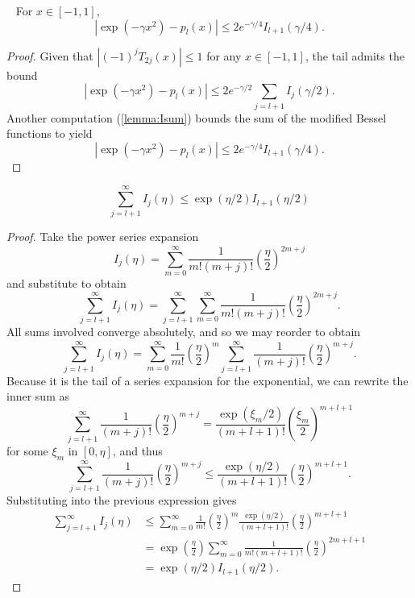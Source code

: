 \begin{lemma}~\label{lemma:errbnd}
  For $x \in [-1,1]$,
  \[
    |\exp(-\gamma x^2)-p_l(x)| \leq 2 e^{-\gamma/4} I_{l+1}(\gamma/4).
  \]
\end{lemma}
\begin{proof}
Given that
$|(-1)^j T_{2j}(x)| \leq 1$ for any $x \in [-1,1]$, the tail
admits the bound
\[
  |\exp(-\gamma x^2)-p_l(x)| \leq
  2 e^{-\gamma/2} \sum_{j=l+1} I_j(\gamma/2).
\]
Another computation (\autoref{lemma:Isum}) bounds the sum of the
modified Bessel functions to yield
\[
  |\exp(-\gamma x^2)-p_l(x)| \leq
  2 e^{-\gamma/4} I_{l+1}(\gamma/4).
\]
\end{proof}


\begin{lemma}\label{lemma:Isum}
  \[
    \sum_{j=l+1}^\infty I_j(\eta) \leq \exp(\eta/2) I_{l+1}(\eta/2)
  \]
\end{lemma}
\begin{proof}
Take the power series expansion
\[
  I_j(\eta) =
    \sum_{m=0}^\infty \frac{1}{m! (m+j)!} \left(\frac{\eta}{2}\right)^{2m+j}
\]
and substitute to obtain
\[
  \sum_{j=l+1}^\infty I_j(\eta) =
    \sum_{j=l+1}^\infty \sum_{m=0}^\infty
    \frac{1}{m! (m+j)!} \left(\frac{\eta}{2}\right)^{2m+j}.
\]
All sums involved converge absolutely, and so we may reorder to obtain
\[
  \sum_{j=l+1}^\infty I_j(\eta) =
  \sum_{m=0}^\infty \frac{1}{m!} \left(\frac{\eta}{2}\right)^m
  \sum_{j=l+1}^\infty
    \frac{1}{(m+j)!} \left(\frac{\eta}{2}\right)^{m+j}.
\]
Because it is the tail of a series expansion for the exponential, we
can rewrite the inner sum as
\[
  \sum_{j=l+1}^\infty
  \frac{1}{(m+j)!} \left(\frac{\eta}{2}\right)^{m+j} =
  \frac{\exp(\xi_m/2)}{(m+l+1)!} \left(\frac{\xi_m}{2}\right)^{m+l+1}
\]
for some $\xi_m$ in $[0,\eta]$, and thus
\[
  \sum_{j=l+1}^\infty
  \frac{1}{(m+j)!} \left(\frac{\eta}{2}\right)^{m+j} \leq
  \frac{\exp(\eta/2)}{(m+l+1)!} \left(\frac{\eta}{2}\right)^{m+l+1}.
\]
Substituting into the previous expression gives
\begin{align*}
  \sum_{j=l+1}^\infty I_j(\eta)
  &\leq
  \sum_{m=0}^\infty \frac{1}{m!} \left(\frac{\eta}{2}\right)^m
  \frac{\exp(\eta/2)}{(m+l+1)!} \left(\frac{\eta}{2}\right)^{m+l+1} \\
  &=
  \exp\left(\frac{\eta}{2}\right)
  \sum_{m=0}^\infty \frac{1}{m! (m+l+1)!}
  \left(\frac{\eta}{2}\right)^{2m+l+1} \\
  &=
  \exp(\eta/2) I_{l+1}(\eta/2).
\end{align*}
\end{proof}
